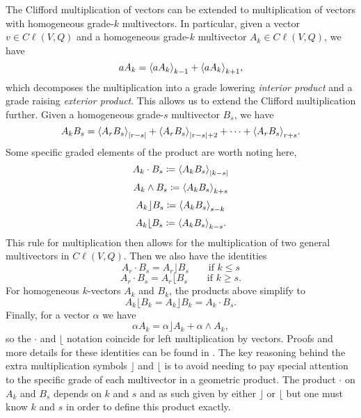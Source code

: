 \documentclass[12pt]{article}
\begin{document}
The Clifford multiplication of vectors can be extended to multiplication of vectors with homogeneous grade-$k$ multivectors.  In particular, given a vector $v \in C\ell(V,Q)$ and a homogeneous grade-$k$ multivector $A_k \in C\ell(V,Q)$, we have
\begin{equation}
\label{eq:vector_multiplication}
aA_k = \proj{k-1}{aA_k} + \proj{k+1}{aA_k},
\end{equation}
which decomposes the multiplication into a grade lowering \emph{interior product} and a grade raising \emph{exterior product}.  This allows us to extend the Clifford multiplication further. Given a homogeneous grade-$s$ multivector $B_s$, we have
\begin{equation}
\label{eq:general_clifford_multiplication}
A_k B_s = \proj{|r-s|}{A_rB_s} + \proj{|r-s|+2}{A_rB_s} + \cdots + \proj{r+s}{A_rB_s}.
\end{equation}
Some specific graded elements of the product are worth noting here,
\begin{equation}
    A_k \cdot B_s \coloneqq \proj{|k-s|}{A_k B_s}
\end{equation}
\begin{equation}
    A_k \wedge B_s \coloneqq \proj{k+s}{A_k B_s}
\end{equation}
\begin{equation}
\label{eq:left_contraction}
    A_k \rfloor B_s \coloneqq \proj{s-k}{A_k B_s}
\end{equation}
\begin{equation}
\label{eq:right_contraction}
    A_k \lfloor B_s \coloneqq \proj{k-s}{A_k B_s}.
\end{equation}
This rule for multiplication then allows for the multiplication of two general multivectors in $C\ell(V,Q)$. Then we also have the identities
\begin{equation}
\label{eq:left_contraction_dot}
A_r \cdot B_s = A_r \rfloor B_s \qquad \textrm{if $k\leq s$}
\end{equation}
\begin{equation}
\label{eq:right_contraction_dot}
A_r \cdot B_s = A_r \lfloor B_s \qquad \textrm{if $k\geq s$}.
\end{equation}
For homogeneous $k$-vectors $A_k$ and $B_k$, the products above simplify to 
\begin{equation}
\label{dot_equivalent_contraction}
    A_k \lfloor B_k = A_k \rfloor B_k = A_k \cdot B_s.
\end{equation}
Finally, for a vector $\alpha$ we have
\begin{equation}
\alpha A_k = \alpha \rfloor A_k + \alpha \wedge A_k,
\end{equation}
so the $\cdot$ and $\lfloor$ notation coincide for left multiplication by vectors. Proofs and more details for these identities can be found in \cite{chisolm_geometric_2012}. The key reasoning behind the extra multiplication symbols $\rfloor$ and $\lfloor$ is to avoid needing to pay special attention to the specific grade of each multivector in a geometric product.  The product $\cdot$ on $A_k$ and $B_s$ depends on $k$ and $s$ and as such given by either $\rfloor$ or $\lfloor$ but one must know $k$ and $s$ in order to define this product exactly.  
\end{document}
